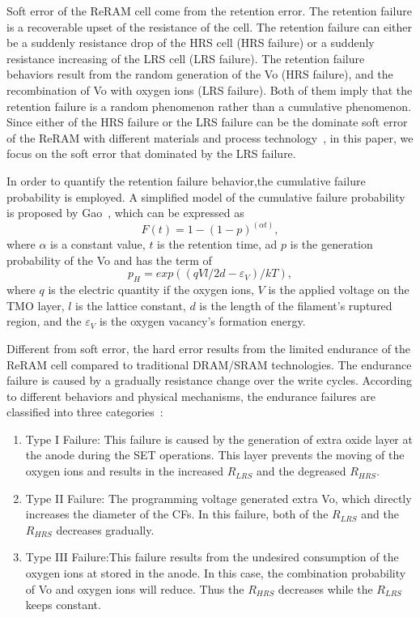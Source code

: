 Soft error of the ReRAM cell come from the retention error. The retention failure is a recoverable upset of the resistance of the cell. The retention failure can either be a suddenly resistance drop of the HRS cell (HRS failure) or a suddenly resistance increasing of the LRS cell (LRS failure). The retention failure behaviors result from the random generation of the Vo (HRS failure), and the recombination of Vo with oxygen ions (LRS failure). Both of them imply that the retention failure is a random phenomenon rather than a cumulative phenomenon. Since either of the HRS failure or the LRS failure can be the dominate soft error of the ReRAM with different materials and process technology~\cite{softerror_yu,softerror_gao}, in this paper, we focus on the soft error that dominated by the LRS failure.

In order to quantify the retention failure behavior,the cumulative failure probability is employed. A simplified model of the cumulative failure probability is proposed by Gao~\cite{softerror_gao}, which can be expressed as
\begin{equation}
F(t) = 1-(1-p)^{(\alpha t)},
\end{equation}
where $\alpha$ is a constant value, $t$ is the retention time, ad $p$ is the generation probability of the Vo and has the term of
\begin{equation}
p_H = exp((qVl/2d-\varepsilon_V)/kT),
\end{equation}
where $q$ is the electric quantity if the oxygen ions, $V$ is the applied voltage on the TMO layer, $l$ is the lattice constant, $d$ is the length of the filament's ruptured region, and the $\varepsilon_V$ is the oxygen vacancy's formation energy. 

Different from soft error, the hard error results from the limited endurance of the ReRAM cell compared to traditional DRAM/SRAM technologies. The endurance failure is caused by a gradually resistance change over the write cycles. According to different behaviors and physical mechanisms, the endurance failures are classified into three categories~\cite{harderror}:
\begin{enumerate}
  \item Type I Failure: This failure is caused by the generation of extra oxide layer at the anode during the SET operations. This layer prevents the moving of the oxygen ions and results in the increased $R_{LRS}$ and the degreased $R_{HRS}$.
  \item Type II Failure: The programming voltage generated extra Vo, which directly increases the diameter of the CFs. In this failure, both of the $R_{LRS}$ and the $R_{HRS}$ decreases gradually.
  \item Type III Failure:This failure results from the undesired consumption of the oxygen ions at stored in the anode. In this case, the combination probability of Vo and oxygen ions will reduce. Thus the $R_{HRS}$ decreases while the $R_{LRS}$ keeps constant.
\end{enumerate}

